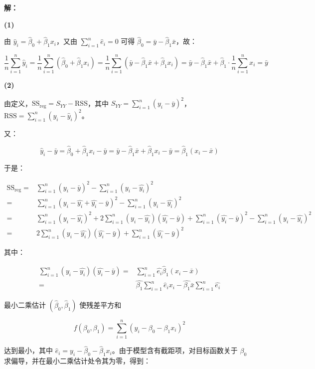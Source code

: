 \documentclass[12pt,a4paper]{article}
\begin{document}
\begin{answerbox}
\textbf{解：}

\textbf{(1)}

由 $\hat{y}_i=\hat{\beta}_0+\hat{\beta}_1x_i$，又由 $\sum_{i=1}^{n}\hat{e}_i=0$ 可得 $\hat{\beta}_0=\bar{y}-\hat{\beta}_1\bar{x}$，故：

$$
\frac{1}{n}\sum_{i=1}^{n}\hat{y}_i=\frac{1}{n}\sum_{i=1}^{n}\left(\hat{\beta}_0+\hat{\beta}_1x_i\right)=\frac{1}{n}\sum_{i=1}^{n}\left(\bar{y}-\hat{\beta}_1\bar{x}+\hat{\beta}_1x_i\right)=\bar{y}-\hat{\beta}_1\bar{x}+\hat{\beta}_1\cdot\frac{1}{n}\sum_{i=1}^{n}x_i=\bar{y}
$$

\textbf{(2)}

由定义，$\mathrm{SS}_{\mathrm{reg}}=S_{YY}-\mathrm{RSS}$，其中 $S_{YY}=\sum_{i=1}^{n}(y_i-\bar{y})^2$，$\mathrm{RSS}=\sum_{i=1}^{n}(y_i-\hat{y}_i)^2$。

又：

$$
\hat{y}_i-\bar{y}=\hat{\beta}_0+\hat{\beta}_1x_i-\bar{y}=\bar{y}-\hat{\beta}_1\bar{x}+\hat{\beta}_1x_i-\bar{y}=\hat{\beta}_1(x_i-\bar{x})
$$

于是：

$$
\begin{aligned}
\mathrm{SS}_{\mathrm{reg}}=&\sum_{i=1}^{n}(y_i-\bar{y})^2-\sum_{i=1}^{n}(y_i-\hat{y_i})^2 \\
=& \sum_{i=1}^{n}(y_i-\hat{y_i}+\hat{y_i}-\bar{y})^2-\sum_{i=1}^{n}(y_i-\hat{y_i})^2 \\
=& \sum_{i=1}^{n}(y_i-\hat{y_i})^2 + 2 \sum_{i=1}^{n}(y_i-\hat{y_i})(\hat{y_i}-\bar{y}) + \sum_{i=1}^{n}(\hat{y_i}-\bar{y})^2-\sum_{i=1}^{n}(y_i-\hat{y_i})^2 \\
=& 2 \sum_{i=1}^{n}(y_i-\hat{y_i})(\hat{y_i}-\bar{y}) + \sum_{i=1}^{n}(\hat{y_i}-\bar{y})^2
\end{aligned}
$$

其中：

$$
\begin{aligned}
\sum_{i=1}^{n}(y_i-\hat{y_i})(\hat{y_i}-\bar{y}) =& \sum_{i=1}^{n}\hat{e_i}\hat{\beta}_1(x_i-\bar{x}) \\
=&\hat{\beta_1}\sum_{i=1}^{n}\hat{e}_ix_i - \hat{\beta_1}\bar{x}\sum_{i=1}^{n}\hat{e_i}
\end{aligned}
$$

最小二乘估计 $(\hat{\beta}_0,\hat{\beta}_1)$ 使残差平方和

$$
f(\beta_0,\beta_1)=\sum_{i=1}^n(y_i-\beta_0-\beta_1x_i)^2
$$

达到最小，其中 $\hat{e}_i=y_i-\hat{\beta}_0-\hat{\beta}_1x_i$。由于模型含有截距项，对目标函数关于 $\beta_0$ 求偏导，并在最小二乘估计处令其为零，得到：


\end{answerbox}
\end{document}
